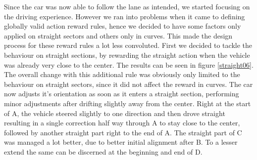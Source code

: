 Since the car was now able to follow the lane as intended, we started focusing on the driving experience. However we ran into problems when it came to defining globally valid action reward rules, hence we decided to have some factors only applied on straight sectors and others only in curves. This made the design process for these reward rules a lot less convoluted. First we decided to tackle the behaviour on straight sections, by rewarding the straight action when the vehicle was already very close to the center. The results can be seen in figure \ref{straight06}. The overall change with this additional rule was obviously only limited to the behaviour on straight sectors, since it did not affect the reward in curves. The car now adjusts it's orientation as soon as it enters a straight section, performing minor adjustments after drifting slightly away from the center. Right at the start of A, the vehicle steered slightly to one direction and then drove straight resulting in a single correction half way through A to stay close to the center, followed by another straight part right to the end of A. The straight part of C was managed a lot better, due to better initial alignment after B. To a lesser extend the same can be discerned at the beginning and end of D.

